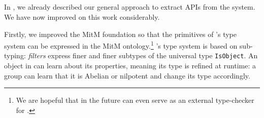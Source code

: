 

\subsection{\GAP}

In \cite{DehKohKon:iop16}, we already described our general approach to extract APIs from the \GAP system.
We have now improved on this work considerably.

Firstly, we improved the MitM foundation so that the primitives of \GAP's type system can be expressed in the MitM ontology.\footnote{We are hopeful that in the future \MMT can even serve as an external type-checker for \GAP.}
\GAP's type system is based on sub-typing: \emph{filters} express finer and finer subtypes of the universal type \lstinline|IsObject|.
An object in \GAP can learn about its properties, meaning its type is refined at runtime: a group can learn that it is Abelian or nilpotent and change its type accordingly.

